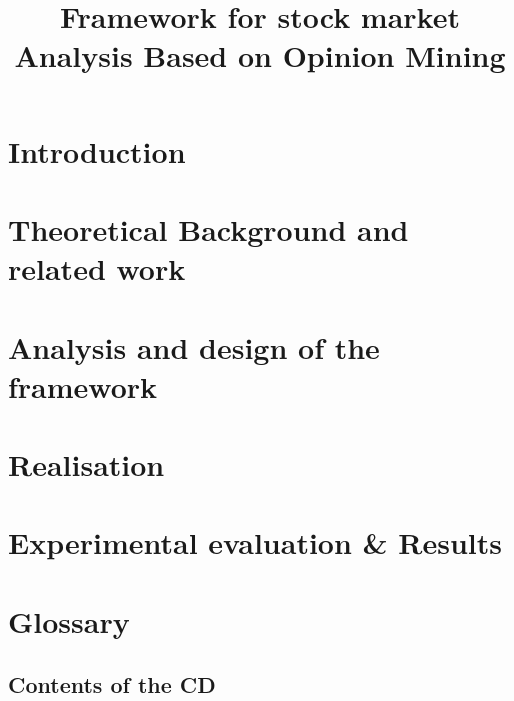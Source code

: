 \documentclass[thesis=M,english]{FITthesis}[2012/10/20]
\title{Framework for stock market Analysis Based on Opinion Mining}
\begin{document}

	\chapter{Introduction}\label{introduction}
	
		
		
	
	\chapter{Theoretical Background and related work}\label{backgroundRelated}
	
		
		
		
	
	\chapter{Analysis and design of the framework}\label{analysisDesign}
	
		
		
		
	
	\chapter{Realisation}\label{Realisation}

		
	
	\chapter{Experimental evaluation \& Results}\label{experimentalEvaluation}
	
		


	\begin{conclusion}
		
	\end{conclusion}

	
		

	\printindex
	
	\appendix

	\chapter{Glossary}

		


	\begin{appendices}
		\chapter{Contents of the CD}\label{app:CDcontent}
			
	\end{appendices}
	
\end{document}

